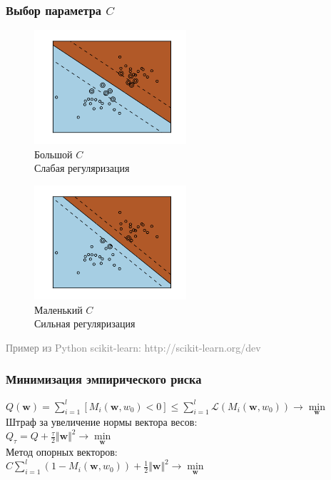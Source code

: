 \documentclass[12pt]{beamer}
\begin{document}
\begin{frame}\frametitle{Выбор параметра $C$}
\begin{figure}[htbp]
	\begin{minipage}{.5\textwidth}
	  \includegraphics[height=120pt, keepaspectratio = true]{images/svm_reg} \\
	  \centering Большой $C$\\ Слабая регуляризация\\
    \end{minipage}%
    \begin{minipage}{.5\textwidth}
		\includegraphics[height=120pt, keepaspectratio = true]{images/svm_non_reg}   \\
		\centering Маленький $C$\\ Сильная регуляризация\\
	\end{minipage}%
\end{figure}
\textcolor{gray}{Пример из Python scikit-learn: http://scikit-learn.org/dev}
\end{frame}

\begin{frame}\frametitle{Минимизация эмпирического риска}
${Q(\mathbf{w}) = \sum\limits_{i=1}^l \left[ M_i(\mathbf{w}, w_0) < 0 \right] \leq\sum\limits_{i=1}^l \mathcal{L}(M_i(\mathbf{w}, w_0)) \rightarrow \min\limits_{\mathbf{w}} }$\\\vspace{3mm}
Штраф за увеличение нормы вектора весов:\\
$Q_{\tau} = Q + \frac{\tau}{2}\Vert \mathbf{w} \Vert^2 \rightarrow \min\limits_{\mathbf{w}}$\\
\vspace{5mm}
Метод опорных векторов:\\
$ C\sum\limits_{i=1}^l (1 - M_i(\mathbf{w}, w_0)) + \frac{1}{2}\Vert \mathbf{w} \Vert^2 \rightarrow \min\limits_{\mathbf{w}}$

\end{frame}
\end{document}

